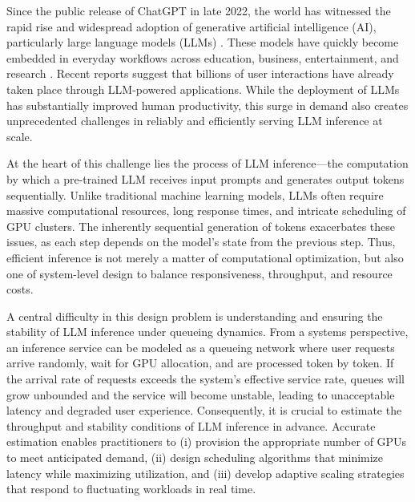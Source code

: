 \documentclass{article}
\theoremstyle{plain}
\theoremstyle{definition}
\theoremstyle{remark}
\begin{document}
Since the public release of ChatGPT in late 2022, the world has witnessed the rapid rise and widespread adoption of generative artificial intelligence (AI), particularly large language models (LLMs) \citep{brown2020language,chowdhery2023palm,openai2023gpt,kaplan2020scaling,wei2022emergent}. These models have quickly become embedded in everyday workflows across education, business, entertainment, and research \citep{chatgpt2023,githubcopilot2023,huang2025orlm}. Recent reports \citep{chatgpt_users_2023,gordon_2024} suggest that billions of user interactions have already taken place through LLM-powered applications. While the deployment of LLMs has substantially improved human productivity, this surge in demand also creates unprecedented challenges in reliably and efficiently serving LLM inference at scale.

At the heart of this challenge lies the process of LLM inference—the computation by which a pre-trained LLM receives input prompts and generates output tokens sequentially. Unlike traditional machine learning models, LLMs often require massive computational resources, long response times, and intricate scheduling of GPU clusters. The inherently sequential generation of tokens exacerbates these issues, as each step depends on the model’s state from the previous step. Thus, efficient inference is not merely a matter of computational optimization, but also one of system-level design to balance responsiveness, throughput, and resource costs.

A central difficulty in this design problem is understanding and ensuring the stability of LLM inference under queueing dynamics. From a systems perspective, an inference service can be modeled as a queueing network where user requests arrive randomly, wait for GPU allocation, and are processed token by token. If the arrival rate of requests exceeds the system’s effective service rate, queues will grow unbounded and the service will become unstable, leading to unacceptable latency and degraded user experience. Consequently, it is crucial to estimate the throughput and stability conditions of LLM inference in advance. Accurate estimation enables practitioners to (i) provision the appropriate number of GPUs to meet anticipated demand, (ii) design scheduling algorithms that minimize latency while maximizing utilization, and (iii) develop adaptive scaling strategies that respond to fluctuating workloads in real time.
\end{document}
